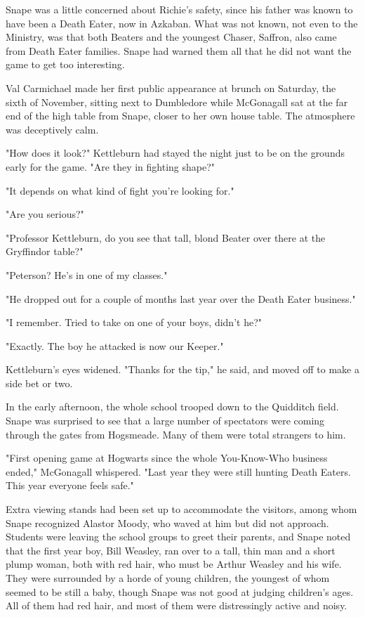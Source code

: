 \documentclass[a4paper,11pt]{article}
\begin{document}
Snape was a little concerned about Richie's safety, since his father was known to have been a Death Eater, now in Azkaban. What was not known, not even to the Ministry, was that both Beaters and the youngest Chaser, Saffron, also came from Death Eater families. Snape had warned them all that he did not want the game to get too interesting.

Val Carmichael made her first public appearance at brunch on Saturday, the sixth of November, sitting next to Dumbledore while McGonagall sat at the far end of the high table from Snape, closer to her own house table. The atmosphere was deceptively calm.

"How does it look?" Kettleburn had stayed the night just to be on the grounds early for the game. "Are they in fighting shape?"

"It depends on what kind of fight you're looking for."

"Are you serious?"

"Professor Kettleburn, do you see that tall, blond Beater over there at the Gryffindor table?"

"Peterson? He's in one of my classes."

"He dropped out for a couple of months last year over the Death Eater business."

"I remember. Tried to take on one of your boys, didn't he?"

"Exactly. The boy he attacked is now our Keeper."

Kettleburn's eyes widened. "Thanks for the tip," he said, and moved off to make a side bet or two.

In the early afternoon, the whole school trooped down to the Quidditch field. Snape was surprised to see that a large number of spectators were coming through the gates from Hogsmeade. Many of them were total strangers to him.

"First opening game at Hogwarts since the whole You-Know-Who business ended," McGonagall whispered. "Last year they were still hunting Death Eaters. This year everyone feels safe."

Extra viewing stands had been set up to accommodate the visitors, among whom Snape recognized Alastor Moody, who waved at him but did not approach. Students were leaving the school groups to greet their parents, and Snape noted that the first year boy, Bill Weasley, ran over to a tall, thin man and a short plump woman, both with red hair, who must be Arthur Weasley and his wife. They were surrounded by a horde of young children, the youngest of whom seemed to be still a baby, though Snape was not good at judging children's ages. All of them had red hair, and most of them were distressingly active and noisy.
\end{document}
